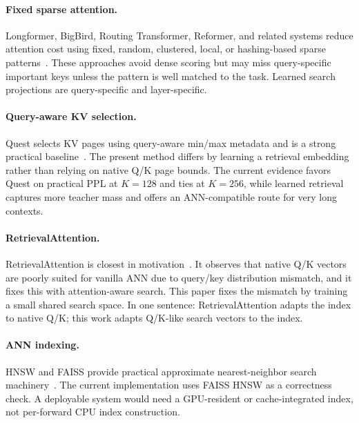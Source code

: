 \documentclass[10pt]{article}
\begin{document}
\paragraph{Fixed sparse attention.}
Longformer, BigBird, Routing Transformer, Reformer, and related systems reduce
attention cost using fixed, random, clustered, local, or hashing-based sparse
patterns~\citep{beltagy2020longformer,zaheer2020bigbird,kitaev2020reformer,roy2021routing}.
These approaches avoid dense scoring but may miss query-specific important keys
unless the pattern is well matched to the task. Learned search projections are
query-specific and layer-specific.

\paragraph{Query-aware KV selection.}
Quest selects KV pages using query-aware min/max metadata and is a strong
practical baseline~\citep{quest2024}. The present method differs by learning a
retrieval embedding rather than relying on native Q/K page bounds. The current
evidence favors Quest on practical PPL at $K=128$ and ties at $K=256$, while
learned retrieval captures more teacher mass and offers an ANN-compatible route
for very long contexts.

\paragraph{RetrievalAttention.}
RetrievalAttention is closest in motivation~\citep{retrievalattention2024}. It
observes that native Q/K vectors are poorly suited for vanilla ANN due to
query/key distribution mismatch, and it fixes this with attention-aware search.
This paper fixes the mismatch by training a small shared search space. In one
sentence: RetrievalAttention adapts the index to native Q/K; this work adapts
Q/K-like search vectors to the index.

\paragraph{ANN indexing.}
HNSW and FAISS provide practical approximate nearest-neighbor search
machinery~\citep{malkov2018hnsw,johnson2019billion}. The current implementation
uses FAISS HNSW as a correctness check. A deployable system would need a
GPU-resident or cache-integrated index, not per-forward CPU index construction.
\end{document}
